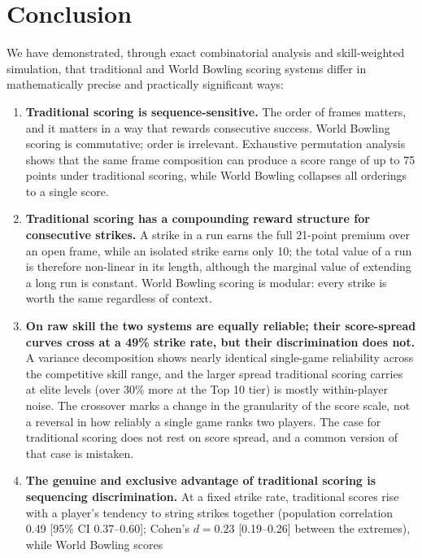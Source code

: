 \documentclass[
  letterpaper,
  DIV=11,
  numbers=noendperiod]{scrartcl}
\begin{document}
\section{Conclusion}\label{conclusion}

We have demonstrated, through exact combinatorial analysis and
skill-weighted simulation, that traditional and World Bowling scoring
systems differ in mathematically precise and practically significant
ways:

\begin{enumerate}
\def\labelenumi{\arabic{enumi}.}
\item
  \textbf{Traditional scoring is sequence-sensitive.} The order of
  frames matters, and it matters in a way that rewards consecutive
  success. World Bowling scoring is commutative; order is irrelevant.
  Exhaustive permutation analysis shows that the same frame composition
  can produce a score range of up to 75 points under traditional
  scoring, while World Bowling collapses all orderings to a single
  score.
\item
  \textbf{Traditional scoring has a compounding reward structure for
  consecutive strikes.} A strike in a run earns the full 21-point
  premium over an open frame, while an isolated strike earns only 10;
  the total value of a run is therefore non-linear in its length,
  although the marginal value of extending a long run is constant. World
  Bowling scoring is modular: every strike is worth the same regardless
  of context.
\item
  \textbf{On raw skill the two systems are equally reliable; their
  score-spread curves cross at a 49\% strike rate, but their
  discrimination does not.} A variance decomposition shows nearly
  identical single-game reliability across the competitive skill range,
  and the larger spread traditional scoring carries at elite levels
  (over 30\% more at the Top 10 tier) is mostly within-player noise. The
  crossover marks a change in the granularity of the score scale, not a
  reversal in how reliably a single game ranks two players. The case for
  traditional scoring does not rest on score spread, and a common
  version of that case is mistaken.
\item
  \textbf{The genuine and exclusive advantage of traditional scoring is
  sequencing discrimination.} At a fixed strike rate, traditional scores
  rise with a player's tendency to string strikes together (population
  correlation 0.49 {[}95\% CI 0.37--0.60{]}; Cohen's \(d = 0.23\)
  {[}0.19--0.26{]} between the extremes), while World Bowling scores

\end{enumerate}
\end{document}
